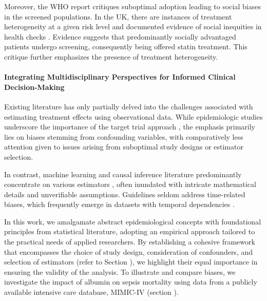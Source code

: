 \documentclass[10pt,letterpaper]{article}
\begin{document}
Moreover, the WHO report critiques suboptimal adoption leading to social biases in the screened populations. In the UK, there are instances of treatment heterogeneity at a given risk level \cite{van2013efficiency} and documented evidence of social inequities in health checks \cite{krska2016implementation}. Evidence suggests that predominantly socially advantaged patients undergo screening, consequently being offered statin treatment. This critique further emphasizes the presence of treatment heterogeneity. 


  \paragraph{Integrating Multidisciplinary Perspectives for Informed Clinical Decision-Making}
 Existing literature has only partially delved into the challenges associated with estimating treatment effects using observational data. While epidemiologic studies underscore the importance of the target trial approach \cite{von2007strengthening,benchimol2015reporting,hernan2020causal,schneeweiss2021conducting,zeng2022uncovering}, the emphasis primarily lies on biases stemming from confounding variables, with comparatively less attention given to issues arising from suboptimal study designs or estimator selection.

 In contrast, machine learning and causal inference literature predominantly concentrate on various estimators \cite{belloni2014high,chernozhukov2018double,shalit2016tutorial,sharma2018tutorial,moraffah2021causal}, often inundated with intricate mathematical details and unverifiable assumptions. Guidelines seldom address time-related biases, which frequently emerge in datasets with temporal dependencies \cite{suissa2008immortal,fu2021timing}.

 In this work, we amalgamate abstract epidemiological concepts with foundational principles from statistical literature, adopting an empirical approach tailored to the practical needs of applied researchers. By establishing a cohesive framework that encompasses the choice of study design, consideration of confounders, and selection of estimators (refer to Section ), we highlight their equal importance in ensuring the validity of the analysis. To illustrate and compare biases, we investigate the impact of albumin on sepsis mortality using data from a publicly available intensive care database, MIMIC-IV \cite{johnson2020mimic} (section ).
\end{document}
